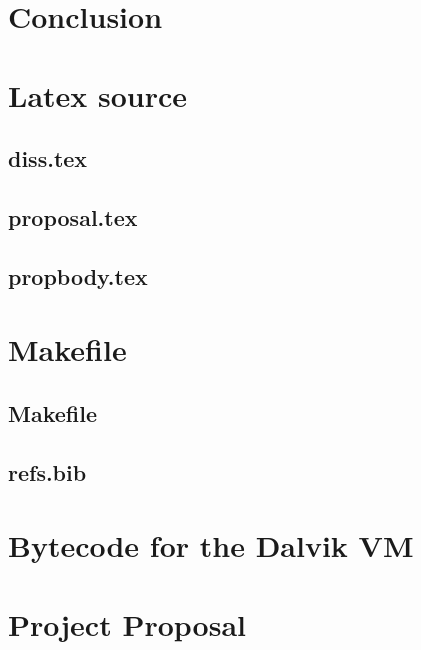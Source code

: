 \documentclass[12pt,twoside,notitlepage]{report}
\begin{document}
\chapter{Conclusion}



\cleardoublepage



\cleardoublepage

\appendix

\chapter{Latex source}

\section{diss.tex}
{\scriptsize}

\section{proposal.tex}
{\scriptsize}

\section{propbody.tex}
{\scriptsize}



\cleardoublepage

\chapter{Makefile}

\section{\label{makefile}Makefile}
{\scriptsize}

\section{refs.bib}
{\scriptsize}


\cleardoublepage

\chapter{Bytecode for the Dalvik VM}

% 


\cleardoublepage

\chapter{Project Proposal}


\end{document}
